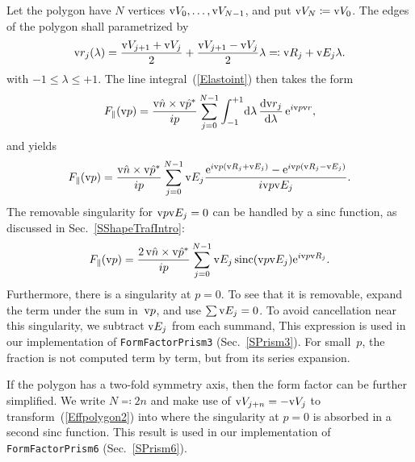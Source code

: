 Let the polygon have $N$ vertices $\text{v}{V}_0,\ldots,\text{v}{V}_{N-1}$,
and put $\text{v}{V}_N\coloneqq\text{v}{V}_0$.
The edges of the polygon shall parametrized by
\begin{equation}
  \text{v}{r}_j(\lambda) = \frac{\text{v}{V}_{j+1}+\text{v}{V}_j}{2} + \frac{\text{v}{V}_{j+1}-\text{v}{V}_j}{2} \lambda
  \eqqcolon \text{v}{R}_j + \text{v}{E}_j\lambda.
\end{equation}
with $-1\le\lambda\le+1$.
The line integral~(\ref{Elastoint}) then takes the form
\begin{equation}
    F_\parallel(\text{v}{p})
   = \frac{\text{v}{\hat n}\times\text{v}{\hat p}^*}{ip} \sum_{j=0}^{N-1}
              \int_{-1}^{+1}\!\text{d}\lambda\, \frac{\text{d}\text{v}{r}_j}{\text{d}\lambda}\,\text{e}^{i\text{v}{p}\text{v}{r}},
\end{equation}
and yields
\begin{equation}\label{Effpolygon1}
    F_\parallel(\text{v}{p})
    = \frac{\text{v}{\hat n}\times\text{v}{\hat p}^*}{ip}
      \sum_{j=0}^{N-1} \text{v}{E}_j \frac{\text{e}^{i\text{v}{p}(\text{v}{R}_j+\text{v}{E}_j)}-\text{e}^{i\text{v}{p}(\text{v}{R}_j-\text{v}{E}_j)}}{i\text{v}{p}\text{v}{E}_j}.
\end{equation}
The removable singularity for $\text{v}{p}\text{v}{E}_j=0$
can be handled by a sinc function, as discussed in Sec.~\ref{SShapeTrafIntro}:
\begin{equation}\label{Effpolygon2}
    F_\parallel(\text{v}{p})
    = \frac{2\,\text{v}{\hat n}\times\text{v}{\hat p}^*}{ip}
      \sum_{j=0}^{N-1} \text{v}{E}_j \operatorname{sinc}(\text{v}{p}\text{v}{E}_j) \text{e}^{i\text{v}{p}\text{v}{R}_j}.
\end{equation}
Furthermore, there is a singularity at $p=0$.
To see that it is removable,
expand the term under the sum in~$\text{v}{p}$,
and use $\sum\text{v}{E}_j=0$.
To avoid cancellation near this singularity, we subtract $\text{v}{E}_j$ from each summand,
This expression is used in our implementation of \texttt{FormFactorPrism3}
(Sec.~\ref{SPrism3}).
For small~$p$, the fraction is not computed term by term,
but from its series expansion.

If the polygon has a two-fold symmetry axis,
then the form factor can be further simplified.
We write $N\eqqcolon2n$
and make use of $\text{v}{V}_{j+n}=-\text{v}{V}_j$ to transform~(\ref{Effpolygon2}) into
where the singularity at $p=0$ is absorbed in a second sinc function.
This result is used in our implementation of \texttt{FormFactorPrism6}
(Sec.~\ref{SPrism6}).
%

